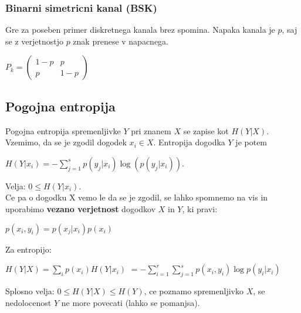 \documentclass{article}
\begin{document}
\begin{multicols}{3}
\subsubsection{Binarni simetricni kanal (BSK)}
Gre za poseben primer diskretnega kanala brez spomina. Napaka kanala je $p$, saj se z verjetnostjo $p$ znak prenese
v napacnega.
\begin{center}
    \begin{math}
        P_k = 
                \begin{pmatrix}
                    1-p & p\\
                    p & 1-p 
                \end{pmatrix}
    \end{math}
\end{center}

\subsection{Pogojna entropija}
Pogojna entropija spremenljivke $Y$ pri znanem $X$ se zapise kot $H(Y|X)$.
Vzemimo, da se je zgodil dogodek $x_i \in X$. Entropija dogodka $Y$ je potem
\begin{center}
    \begin{math}
        H(Y|x_i) = - \sum_{j=1}^s p(y_j|x_i) \log(p(y_j| x_i)).
    \end{math}
\end{center}
Velja: $0 \leq H(Y| x_i)$.\\
Ce pa o dogodku X vemo le da se je zgodil, se lahko spomnemo na vis in uporabimo
\textbf{vezano verjetnost} dogodkov $X$ in $Y$, ki pravi:
\begin{center}
    \begin{math}
        p(x_i, y_i) = p(x_j|x_i)p(x_i)
    \end{math}
\end{center}
Za entropijo:
\begin{center}
    \begin{math}
        H(Y|X) = \sum_{i} p(x_i)H(Y|x_i)
    \end{math}
    \begin{math}
        = -\sum_{i=1}^r \sum_{j=1}^s p(x_i, y_i) \log p(y_i | x_i)
    \end{math}
\end{center}
Splosno velja: $0 \leq H(Y|X) \leq H(Y)$, ce poznamo spremenljivko $X$, se nedolocenost $Y$ ne more povecati (lahko se pomanjsa).


\end{multicols}
\end{document}
